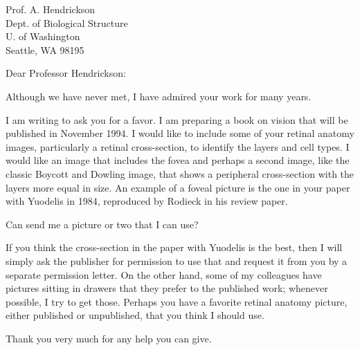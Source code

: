 

\vspace{0.6in}

Prof. A. Hendrickson \\
Dept. of Biological Structure \\
U. of Washington \\
Seattle, WA 98195

\mydate

Dear Professor Hendrickson:

Although we have never met, I have admired your work for many years.

I am writing to ask you for a favor.
I am preparing a book on vision that will be published
in November 1994.
I would like to include some of your retinal
anatomy images, particularly a retinal cross-section,
to identify the layers and cell types.
I would like an image that includes the fovea and
perhaps a second image, like the classic Boycott and Dowling
image, that shows a peripheral cross-section with the layers
more equal in size.
An example of a foveal picture
is the one in your paper with Yuodelis in 1984, reproduced
by Rodieck in his review paper.

Can send me a picture or two that I can use?

If you think the cross-section in the paper with Yuodelis is the
best, then I will simply ask the publisher for permission to use
that and request it from you by a separate permission letter.
On the other hand, some of my colleagues have pictures sitting
in drawers that they prefer to the published work;
whenever possible, I try to get those.
Perhaps you have a favorite retinal anatomy picture,
either published or unpublished, that you think I should use.

Thank you very much for any help you can give.


